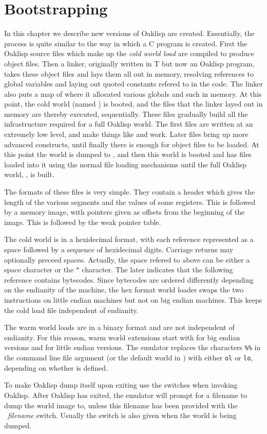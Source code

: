 \chapter{Bootstrapping}

In this chapter we describe new versions of Oaklisp are created.
Essentially, the process is quite similar to the way in which a C
program is created.  First the Oaklisp source files which make up the
{\em cold world load} are compiled to produce object files.  Then a
linker, originally written in T but now an Oaklisp program, takes
these object files and lays them all out in memory, resolving
references to global variables and laying out quoted constants refered
to in the code.  The linker also puts a map of where it allocated
various globals and such in memory.  At this point, the cold world
(named ) is booted, and the files that the linker
layed out in memory are thereby executed, sequentially.  These files
gradually build all the infrastructure required for a full Oaklisp
world.  The first files are written at an extremely low level, and
make things like  and  work.  Later files bring up
more advanced constructs, until finally there is enough for object
files to be loaded.  At this point the world is dumped to
, and then this world is booted and has files loaded
into it using the normal file loading mechanisms until the full
Oaklisp world, , is built.

The formats of these files is very simple.  They contain a header
which gives the length of the various segments and the values of some
registers.  This is followed by a memory image, with pointers given as
offsets from the beginning of the image.  This is followed by the weak
pointer table.

The cold world is in a hexidecimal format, with each reference
represented as a space followed by a sequence of hexidecimal digits.
Carriage returns may optionally preceed spaces.  Actually, the space
refered to above can be either a space character or the \verb|^|
character.  The later indicates that the following reference contains
bytecodes.  Since bytecodes are ordered differently depending on the
endianity of the machine, the hex format world loader swaps the two
instructions on little endian machines but not on big endian machines.
This keeps the cold load file independent of endianity.

The warm world loads are in a binary format and are not independent
of endianity.  For this reason, warm world extensions start with
 for big endian versions and  for little endian
versions.  The emulator replaces the characters {\tt \%\%} in the
command line file argument (or the default world in )
with either {\tt ol} or {\tt lo}, depending on whether
 is defined.

To make Oaklisp dump itself upon exiting use the  
switches when invoking Oaklisp.  After Oaklisp has exited, the
emulator will prompt for a filename to dump the world image to, unless
this filename has been provided with the ~{\em filename}
switch.  Usually the  switch is also given when the world is
being dumped.
